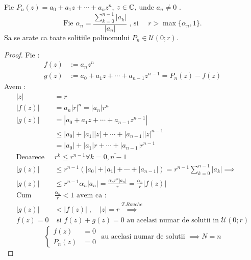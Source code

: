 \begin{aplicatie}
    Fie $P_n(z) = a_0 + a_1 z + \cdots + a_n z^n$, $z \in \mathbb{C}$, unde $a_n \neq 0$ .
    \[
        \text{Fie } \alpha_n = \frac{ \sum_{k=0}^{n-1} |a_k|}{|a_n|}
             \text{ , si } \quad r > \max\{\alpha_n,1\} .
    \]
    Sa se arate ca toate solitiile polinomului $P_n \in \mathcal{U}(0;r)$.
    \begin{proof}
        Fie :
        \begin{align*}
            f(z) &:= a_n z^n \\
            g(z) &:= a_0 + a_1 z + \cdots + a_{n-1}z^{n-1} = P_n(z) - f(z)
        \end{align*}
        Avem :
        \begin{align*}
            |z| &= r \\
            |f(z)| &= a_n |r|^n = |a_n| r^n\\
            |g(z)| &= |a_0 + a_1 z + \cdots + a_{n-1}z^{n-1}| \\
                   &\leq |a_0| + |a_1| |z| + \cdots + |a_{n-1}| |z|^{n-1}\\
                   &= |a_0| + |a_1| r + \cdots + |a_{n-1}|r^{n-1}\\
            \text{Deoarece } & r^k \leq r^{n-1} \forall k = \overline{0,n-1} \\
            |g(z)| &\leq r^{n-1} (|a_0| + |a_1| + \cdots + |a_{n-1}|)
                = r^{n-1}\sum_{k=0}^{n-1}|a_k| \implies \\
            |g(z)| &\leq r^{n-1} \alpha_n |a_n|
                = \frac{\alpha_n r^n |a_n|}{r} = \frac{\alpha_n}{r} |f(z)| \\
            \text{Cum } & \frac{\alpha_n}{r} < 1 \text{ avem ca : }\\
            |g(z)| & < |f(z)| \;,\quad |z| = r
                \overset{T.Rouche}{\implies}\\
            f(z) = 0 & \text{ si } f(z) + g(z) = 0
                \text{ au acelasi numar de solutii in } \mathcal{U}(0;r)
        \end{align*}
        \[
            \left \{
                \begin{aligned}
                    f(z) &= 0 \\
                    P_n(z) &= 0
                \end{aligned}
            \right.
            \text{ au acelasi numar de solutii } \implies N = n
        \]

    \end{proof}
\end{aplicatie}